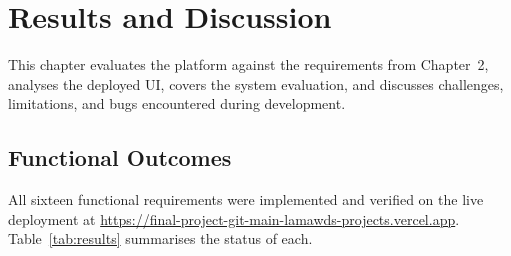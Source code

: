 \documentclass[12pt,a4paper]{report}
\begin{document}
\newpage

\chapter{Results and Discussion}

This chapter evaluates the platform against the requirements from Chapter~2, analyses the deployed UI, covers the system evaluation, and discusses challenges, limitations, and bugs encountered during development.

\section{Functional Outcomes}
\label{sec:results-func}

All sixteen functional requirements were implemented and verified on the live deployment at \url{https://final-project-git-main-lamawds-projects.vercel.app}. Table~\ref{tab:results} summarises the status of each.
\end{document}
